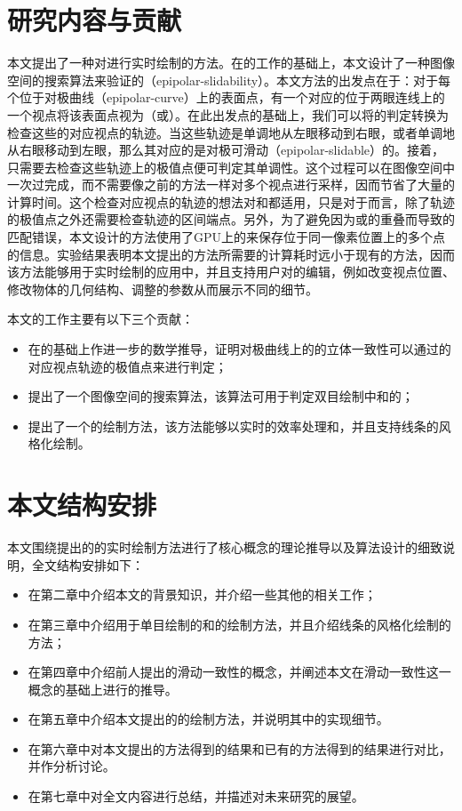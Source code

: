 \section{研究内容与贡献}

本文提出了一种对\stc{}\vdl{}进行实时绘制的方法。在\citeauthor{kim2013stereoscopic}的工作的基础上，本文设计了一种图像空间的搜索算法来验证\vdp{}的\epsl{}（epipolar-slidability）。本文方法的出发点在于：对于每个位于对极曲线（epipolar-curve）上的表面点，有一个对应的位于两眼连线上的一个视点将该表面点视为\conp{}（或\sconp{}）。在此出发点的基础上，我们可以将\epsl{}的判定转换为检查这些\vdp{}的对应视点的轨迹。当这些轨迹是单调地从左眼移动到右眼，或者单调地从右眼移动到左眼，那么其对应的\vdp{}是对极可滑动（epipolar-slidable）的。接着，只需要去检查这些轨迹上的极值点便可判定其单调性。这个过程可以在图像空间中一次过完成，而不需要像之前的方法一样对多个视点进行采样，因而节省了大量的计算时间。这个检查对应视点的轨迹的想法对\con{}和\scon{}都适用，只是对于\scon{}而言，除了轨迹的极值点之外还需要检查轨迹的区间端点。另外，为了避免因为\conp{}或\sconp{}的重叠而导致的匹配错误，本文设计的方法使用了GPU上的\ppll{}\cite{yang2010real}来保存位于同一像素位置上的多个点的信息。实验结果表明本文提出的方法所需要的计算耗时远小于现有的方法，因而该方法能够用于实时绘制的应用中，并且支持用户对\stc{}\vdl{}的编辑，例如改变视点位置、修改物体的几何结构、调整\vdl{}的参数从而展示不同的细节。

本文的工作主要有以下三个贡献：

\begin{itemize}
    \item 在\epsl{}的基础上作进一步的数学推导，证明对极曲线上的\vdp{}的立体一致性可以通过\vdp{}的对应视点轨迹的极值点来进行判定；
    \item 提出了一个图像空间的搜索算法，该算法可用于判定双目绘制中\con{}和\scon{}的\epsl{}；
    \item 提出了一个\stc{}\vdl{}的绘制方法，该方法能够以实时的效率处理\con{}和\scon{}，并且支持线条的风格化绘制。
\end{itemize}

\section{本文结构安排}

本文围绕提出的\stc{}\vdl{}的实时绘制方法进行了核心概念的理论推导以及算法设计的细致说明，全文结构安排如下：

\begin{itemize}
    \item 在第二章中介绍本文的背景知识，并介绍一些其他的相关工作；
    \item 在第三章中介绍用于单目绘制的\con{}和\scon{}的绘制方法，并且介绍线条的风格化绘制的方法；
    \item 在第四章中介绍前人提出的滑动一致性的概念，并阐述本文在滑动一致性这一概念的基础上进行的推导。
    \item 在第五章中介绍本文提出的\stc{}\vdl{}的绘制方法，并说明其中的实现细节。
    \item 在第六章中对本文提出的方法得到的结果和已有的方法得到的结果进行对比，并作分析讨论。
    \item 在第七章中对全文内容进行总结，并描述对未来研究的展望。
\end{itemize}